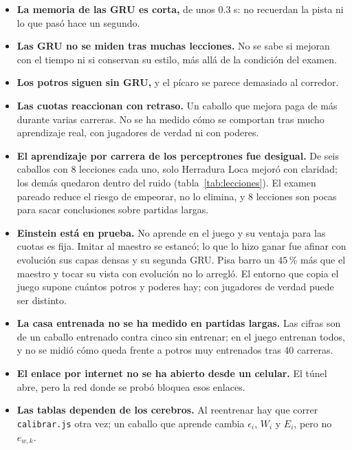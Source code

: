 \documentclass[11pt,letterpaper]{article}
\begin{document}
\begin{itemize}
\item \textbf{La memoria de las GRU es corta,} de unos 0.3 s: no recuerdan la pista ni lo que pasó hace un segundo.\item \textbf{Las GRU no se miden tras muchas lecciones.} No se sabe si mejoran con el tiempo ni si conservan su estilo, más allá de la condición del examen.\item \textbf{Los potros siguen sin GRU,} y el pícaro se parece demasiado al corredor. \item \textbf{Las cuotas reaccionan con retraso.} Un caballo que mejora paga de más durante varias carreras. No se ha medido cómo se comportan tras mucho aprendizaje real, con jugadores de verdad ni con poderes.\item \textbf{El aprendizaje por carrera de los perceptrones fue desigual.} De seis caballos con 8 lecciones cada uno, solo Herradura Loca mejoró con claridad; los demás quedaron dentro del ruido (tabla~\ref{tab:lecciones}). El examen pareado reduce el riesgo de empeorar, no lo elimina, y 8 lecciones son pocas para sacar conclusiones sobre partidas largas.
\item \textbf{Einstein está en prueba.} No aprende en el juego y su ventaja para las cuotas es fija. Imitar al maestro se estancó; lo que lo hizo ganar fue afinar con evolución sus capas densas y su segunda GRU. Pisa barro un $45$\,\% más que el maestro y tocar su vista con evolución no lo arregló. El entorno que copia el juego supone cuántos potros y poderes hay; con jugadores de verdad puede ser distinto.
\item \textbf{La casa entrenada no se ha medido en partidas largas.} Las cifras son de un caballo entrenado contra cinco sin entrenar; en el juego entrenan todos, y no se midió cómo queda frente a potros muy entrenados tras 40 carreras.
\item \textbf{El enlace por internet no se ha abierto desde un celular.} El túnel abre, pero la red donde se probó bloquea esos enlaces.
\item \textbf{Las tablas dependen de los cerebros.} Al reentrenar hay que correr \texttt{calibrar.js} otra vez; un caballo que aprende cambia $\epsilon_i$, $W_i$ y $E_i$, pero no $e_{w,k}$.
\end{itemize}
\end{document}
